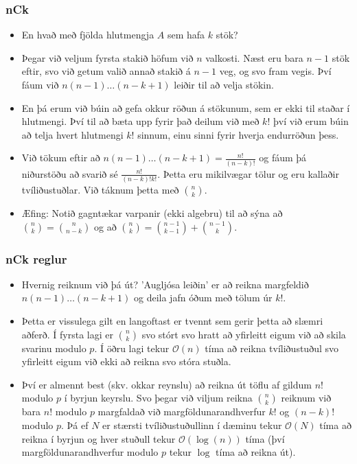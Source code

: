 \documentclass{beamer}
\begin{document}
\begin{frame}
\frametitle{nCk}

\begin{itemize}

\item<1-> En hvað með fjölda hlutmengja $A$ sem hafa $k$ stök?

\item<2-> Þegar við veljum fyrsta stakið höfum við $n$ valkosti. Næst eru bara $n - 1$ stök eftir, svo við getum valið annað stakið á $n - 1$ veg, og svo fram vegis. Því fáum við $n(n-1)\dots(n-k+1)$ leiðir til að velja stökin.

\item<3-> En þá erum við búin að gefa okkur röðun á stökunum, sem er ekki til staðar í hlutmengi. Því til að bæta upp fyrir það deilum við með $k!$ því við erum búin að telja hvert hlutmengi $k!$ sinnum, einu sinni fyrir hverja endurröðun þess.

\item<4-> Við tökum eftir að $n(n-1)\dots(n-k+1) = \frac{n!}{(n-k)!}$ og fáum þá niðurstöðu að svarið sé $\frac{n!}{(n-k)!k!}$. Þetta eru mikilvægar tölur og eru kallaðir tvíliðustuðlar. Við táknum þetta með $\binom{n}{k}$.

\item<5-> Æfing: Notið gagntækar varpanir (ekki algebru) til að sýna að $\binom{n}{k} = \binom{n}{n-k}$ og að $\binom{n}{k} = \binom{n - 1}{k - 1} + \binom{n - 1}{k}$.

\end{itemize}

\end{frame}

\begin{frame}
\frametitle{nCk reglur}

\begin{itemize}

\item<1-> Hvernig reiknum við þá út? 'Augljósa leiðin' er að reikna margfeldið $n(n-1)\dots(n-k+1)$ og deila jafn óðum með tölum úr $k!$.

\item<2-> Þetta er vissulega gilt en langoftast er tvennt sem gerir þetta að slæmri aðferð. Í fyrsta lagi er $\binom{n}{k}$ svo stórt svo hratt að yfirleitt eigum við að skila svarinu modulo $p$. Í öðru lagi tekur $\mathcal{O}(n)$ tíma að reikna tvíliðustuðul svo yfirleitt eigum við ekki að reikna svo stóra stuðla.

\item<3-> Því er almennt best (skv. okkar reynslu) að reikna út töflu af gildum $n!$ modulo $p$ í byrjun keyrslu. Svo þegar við viljum reikna $\binom{n}{k}$ reiknum við bara $n!$ modulo $p$ margfaldað við margföldunarandhverfur $k!$ og $(n - k)!$ modulo $p$. Þá ef $N$ er stærsti tvíliðustuðullinn í dæminu tekur $\mathcal{O}(N)$ tíma að reikna í byrjun og hver stuðull tekur $\mathcal{O}(\log(n))$ tíma (því margföldunarandhverfur modulo $p$ tekur $\log$ tíma að reikna út).

\end{itemize}

\end{frame}
\end{document}
